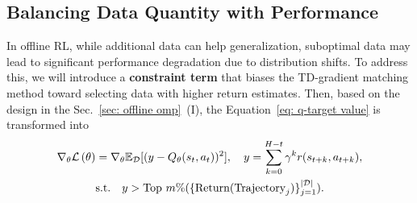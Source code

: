 


\subsection{Balancing Data Quantity with Performance}\label{sec:method:outer}
In offline RL, while additional data can help generalization, suboptimal data may lead to significant performance degradation due to distribution shifts. To address this, we will introduce a \textbf{constraint term} that biases the TD-gradient matching method toward selecting data with higher return estimates.
Then, based on the design in the Sec.~\ref{sec: offline omp}~(I), the Equation~\ref{eq: q-target value} is transformed into
\begin{equation}
\begin{aligned}
\label{eq: q-target value constraint}
    \nabla_{\theta}\mathcal L\left(\theta\right) &= \nabla_{\theta}\mathbb{E}_\mathcal{D}[(y - Q_{\theta}(s_t,a_t))^2], \quad
    y = \sum_{k=0}^{H-t} \gamma^k r(s_{t+k}, a_{t+k}),\\
    & \text{s.t.} \quad y > \text{\rm Top}~m\%(\{\text{Return}(\text{Trajectory}_j)\}_{j=1}^{|\mathcal{D}|}).
\end{aligned}
\end{equation}

